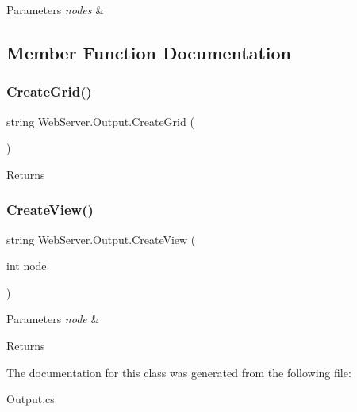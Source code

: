 \begin{DoxyParams}{Parameters}
{\em nodes} & \\
\hline
\end{DoxyParams}


\subsection{Member Function Documentation}
\mbox{\label{class_web_server_1_1_output_a422c76e72ef2cb2f4d1a270230c15e15}} 
\subsubsection{\texorpdfstring{Create\+Grid()}{CreateGrid()}}
{\footnotesize\ttfamily string Web\+Server.\+Output.\+Create\+Grid (\begin{DoxyParamCaption}{ }\end{DoxyParamCaption})}





\begin{DoxyReturn}{Returns}

\end{DoxyReturn}
\mbox{\label{class_web_server_1_1_output_abbf9c895337a7b5c90f819e5f4f99c82}} 
\subsubsection{\texorpdfstring{Create\+View()}{CreateView()}}
{\footnotesize\ttfamily string Web\+Server.\+Output.\+Create\+View (\begin{DoxyParamCaption}\item[{int}]{node }\end{DoxyParamCaption})}






\begin{DoxyParams}{Parameters}
{\em node} & \\
\hline
\end{DoxyParams}
\begin{DoxyReturn}{Returns}

\end{DoxyReturn}


The documentation for this class was generated from the following file\+:\begin{DoxyCompactItemize}
\item 
Output.\+cs\end{DoxyCompactItemize}
